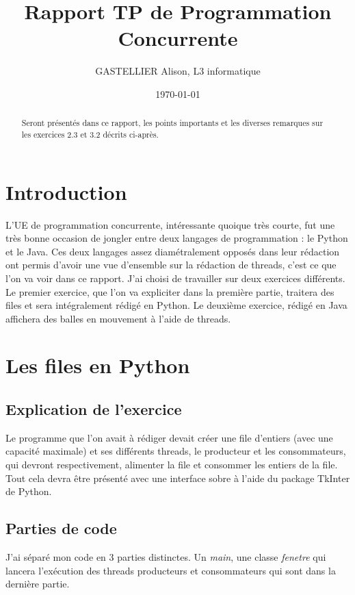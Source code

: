 \documentclass{article}
\title{Rapport TP de Programmation Concurrente}
\author{GASTELLIER Alison, L3 informatique}
\date{\today}
\begin{document}
\maketitle %


\begin{abstract}
  Seront présentés dans ce rapport, les points importants et les diverses remarques sur les exercices 2.3 et 3.2 décrits ci-après.
\end{abstract}

\section{Introduction}
L'UE de programmation concurrente, intéressante quoique très courte, fut une très bonne occasion de jongler entre deux langages de programmation : le Python et le Java. Ces deux langages assez diamétralement opposés dans leur rédaction ont permis d'avoir une vue d'ensemble sur la rédaction de threads, c'est ce que l'on va voir dans ce rapport. J'ai choisi de travailler sur deux exercices différents.
Le premier exercice, que l'on va expliciter dans la première partie, traitera des files et sera intégralement rédigé en Python. Le deuxième exercice, rédigé en Java affichera des balles en mouvement à l'aide de threads.

\section{Les files en Python}
\subsection{Explication de l'exercice}
Le programme que l'on avait à rédiger devait créer une file d'entiers (avec une capacité maximale) et ses différents threads, le producteur et les consommateurs, qui devront respectivement, alimenter la file et consommer les entiers de la file. Tout cela devra être présenté avec une interface sobre à l'aide du package TkInter de Python. 

\subsection{Parties de code}
J'ai séparé mon code en 3 parties distinctes. Un \textit{main}, une classe \textit{fenetre} qui lancera l'exécution des threads producteurs et consommateurs qui sont dans la dernière partie. 
\end{document}
